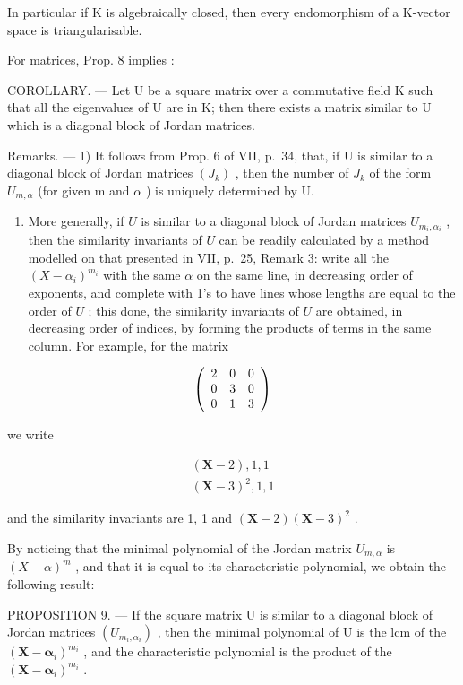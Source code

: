 In particular if K is algebraically closed, then every endomorphism of a K-vector space is triangularisable.

For matrices, Prop. 8 implies :

COROLLARY. --- Let U be a square matrix over a commutative field K such that all the eigenvalues of U are in K; then there exists a matrix similar to U which is a diagonal block of Jordan matrices.

Remarks. --- 1) It follows from Prop. 6 of VII, p.~34, that, if U is similar to a diagonal block of Jordan matrices \((J_{k})\) , then the number of \(J_{k}\) of the form \(U_{m,\alpha}\) (for given m and \(\alpha\) ) is uniquely determined by U.

\begin{enumerate}
\def\labelenumi{\arabic{enumi})}
\setcounter{enumi}{1}
\tightlist
\item
  More generally, if \(U\) is similar to a diagonal block of Jordan matrices \(U_{m_i,\alpha_i}\) , then the similarity invariants of \(U\) can be readily calculated by a method modelled on that presented in VII, p.~25, Remark 3: write all the \((X - \alpha_i)^{m_i}\) with the same \(\alpha\) on the same line, in decreasing order of exponents, and complete with 1's to have lines whose lengths are equal to the order of \(U\) ; this done, the similarity invariants of \(U\) are obtained, in decreasing order of indices, by forming the products of terms in the same column. For example, for the matrix
\end{enumerate}

\[
\left( \begin{array}{c c c} 2 & 0 & 0 \\ 0 & 3 & 0 \\ 0 & 1 & 3 \end{array} \right)
\]

we write

\[
\begin{array}{l} (\mathbf {X} - 2), 1, 1 \\ (\mathbf {X} - 3) ^ {2}, 1, 1 \end{array}
\]

and the similarity invariants are 1, 1 and \((\mathbf{X} - 2)(\mathbf{X} - 3)^2\) .

By noticing that the minimal polynomial of the Jordan matrix \(U_{m,\alpha}\) is \((X-\alpha)^{m}\) , and that it is equal to its characteristic polynomial, we obtain the following result:

PROPOSITION 9. --- If the square matrix U is similar to a diagonal block of Jordan matrices \((U_{m_{i},\alpha_{i}})\) , then the minimal polynomial of U is the lcm of the \((\mathbf{X}-\boldsymbol{\alpha}_{i})^{m_{i}}\) , and the characteristic polynomial is the product of the \((\mathbf{X}-\boldsymbol{\alpha}_{i})^{m_{i}}\) .

